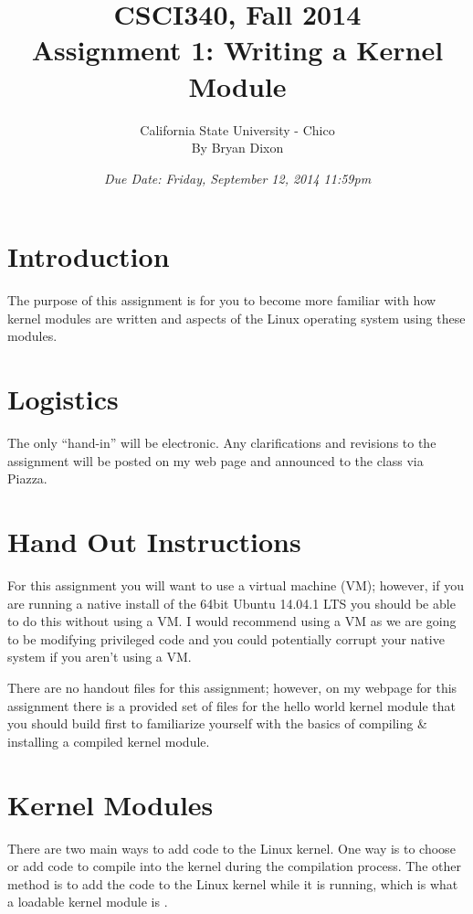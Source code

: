 \documentclass[11pt]{article}
\begin{document}
\title{CSCI340, Fall 2014\\
Assignment 1: Writing a Kernel Module
}

\author{California State University - Chico\\
  By Bryan Dixon\\
}
\date{\emph{Due Date: Friday, September 12, 2014 11:59pm}}


\maketitle

\section*{Introduction}
The purpose of this assignment is for you to become more familiar with how kernel modules are written and aspects of the Linux operating system using these modules. 

\section*{Logistics}

The only ``hand-in'' will be electronic.  Any clarifications and revisions to the assignment will
be posted on my web page and announced to the class via Piazza.

\section*{Hand Out Instructions}

For this assignment you will want to use a virtual machine (VM); however, if you are running a native install of the 64bit Ubuntu 14.04.1 LTS you should be able to do this without using a VM. I would recommend using a VM as we are going to be modifying privileged code and you could potentially corrupt your native system if you aren't using a VM. 

There are no handout files for this assignment; however, on my webpage for this assignment there is a provided set of files for the hello world kernel module that you should build first to familiarize yourself with the basics of compiling \& installing a compiled kernel module. 


\section*{Kernel Modules}

There are two main ways to add code to the Linux kernel. One way is to choose or add code to compile into the kernel during the compilation process. The other method is to add the code to the Linux kernel while it is running, which is what a loadable kernel module is \cite{tldp}.
\end{document}
